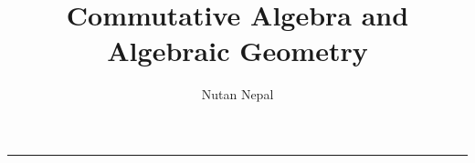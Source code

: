 
\title{Commutative Algebra and Algebraic Geometry}
\author{Nutan Nepal}



\maketitle
\section{}

\begin{prob}
\end{prob}
\begin{questions}\hrule
    
    
    
    
    
    
\end{questions}


